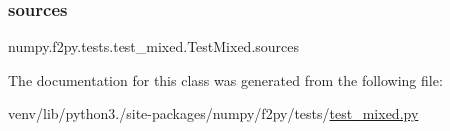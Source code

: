 \subsubsection{\texorpdfstring{sources}{sources}}
{\footnotesize\ttfamily numpy.\+f2py.\+tests.\+test\+\_\+mixed.\+Test\+Mixed.\+sources\hspace{0.3cm}{\ttfamily [static]}}



The documentation for this class was generated from the following file\+:\begin{DoxyCompactItemize}
\item 
venv/lib/python3./site-\/packages/numpy/f2py/tests/\hyperlink{test__mixed_8py}{test\+\_\+mixed.\+py}\end{DoxyCompactItemize}
